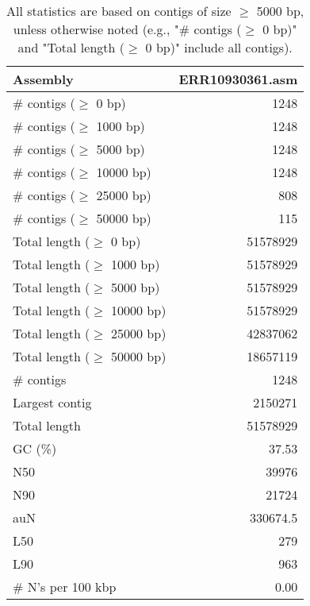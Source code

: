 \documentclass[12pt,a4paper]{article}
\begin{document}
\begin{table}[ht]
\begin{center}
\caption{All statistics are based on contigs of size $\geq$ 5000 bp, unless otherwise noted (e.g., "\# contigs ($\geq$ 0 bp)" and "Total length ($\geq$ 0 bp)" include all contigs).}
\begin{tabular}{|l*{1}{|r}|}
\hline
Assembly & ERR10930361.asm \\ \hline
\# contigs ($\geq$ 0 bp) & 1248 \\ \hline
\# contigs ($\geq$ 1000 bp) & 1248 \\ \hline
\# contigs ($\geq$ 5000 bp) & 1248 \\ \hline
\# contigs ($\geq$ 10000 bp) & 1248 \\ \hline
\# contigs ($\geq$ 25000 bp) & 808 \\ \hline
\# contigs ($\geq$ 50000 bp) & 115 \\ \hline
Total length ($\geq$ 0 bp) & 51578929 \\ \hline
Total length ($\geq$ 1000 bp) & 51578929 \\ \hline
Total length ($\geq$ 5000 bp) & 51578929 \\ \hline
Total length ($\geq$ 10000 bp) & 51578929 \\ \hline
Total length ($\geq$ 25000 bp) & 42837062 \\ \hline
Total length ($\geq$ 50000 bp) & 18657119 \\ \hline
\# contigs & 1248 \\ \hline
Largest contig & 2150271 \\ \hline
Total length & 51578929 \\ \hline
GC (\%) & 37.53 \\ \hline
N50 & 39976 \\ \hline
N90 & 21724 \\ \hline
auN & 330674.5 \\ \hline
L50 & 279 \\ \hline
L90 & 963 \\ \hline
\# N's per 100 kbp & 0.00 \\ \hline
\end{tabular}
\end{center}
\end{table}
\end{document}
